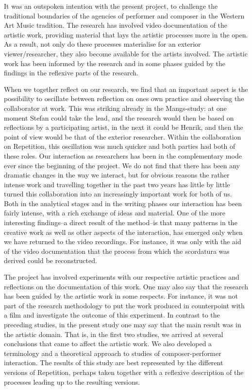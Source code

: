 It was an outspoken intention with the present project, to challenge
the traditional boundaries of the agencies of performer and composer
in the Western Art Music tradition. The research has involved video
documentation of the artistic work, providing material that lays the
artistic processes more in the open. As a result, not only do these
processes materialise for an exterior viewer/researcher, they also
become available for the artists involved. The artistic work has been
informed by the research and in some phases guided by the findings in
the reflexive parts of the research.

When we together reflect on our research, we find that an important
aspect is the possibility to oscillate between reflection on ones own
practice and observing the collaborator at work. This was striking
already in the Mangs-study: at one moment Stefan could take the lead,
and the research would then be based on reflections by a participating
artist, in the next it could be Henrik, and then the point of view
would be that of the exterior researcher. Within the collaboration on
Repetition, this oscillation was much quicker and both parties had
both of these roles. Our interaction as researchers has been in the
complementary mode ever since the beginning of the project. We do not
find that there has been any dramatic changes in the way we interact,
but for obvious reasons the rather intense work and travelling
together in the past two years has little by little turned this
collaboration into an increasingly important work for both of us. Both
in the analytical stages and in the writing phases our interaction has
been fairly intense, with a rich exchange of ideas and material. One
of the more interesting findings--a direct result of the method--is
that many patterns in the creative work as well as other aspects of
the interaction, has emerged only when we have returned to the video
recordings. For instance, it was only with the aid of the video
documentation that the process from which the scordatura was derived
could be reconstructed.
 
The project has involved experiments with our respective artistic
practices and reflections on the documentation of this work. One may
also say that the research has been guided by the artistic work in
some respects. For instance, it was not part of the research
methodology to put the work produced in counterpoint with a film and
investigate the outcome of this experiment. In contrast to the
preceding studies, in the present study one may say that the main
result was in the artistic domain. That is, in the first two studies,
we arrived at several conclusions that came to affect the artistic
work. We also developed a terminology and a theoretical approach to
studies of composer-performer interaction. The results of this study
are best represented by the different versions of Repetition, perhaps
taken together with a reflexive description of the processes leading
up to the resulting versions.

